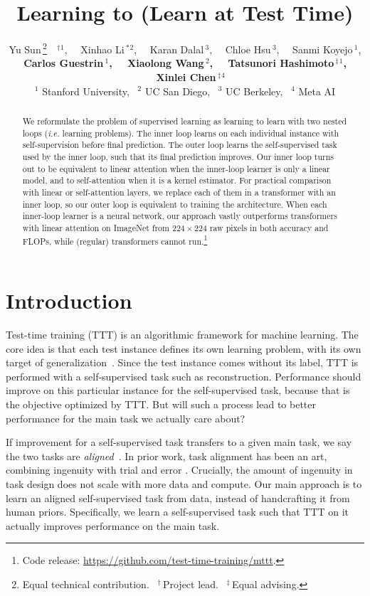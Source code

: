 \documentclass{article} %
\title{Learning to (Learn at Test Time)}
\author{
Yu Sun\,\thanks{Equal technical contribution.
                ~$^\dag$\,Project lead.
                ~$^\ddag$\,Equal advising.}~~$^\dag$$^1$,
~~Xinhao Li\,$^*$$^2$,
~~Karan Dalal\,$^3$,
~~Chloe Hsu\,$^3$,
~~Sanmi Koyejo\,$^1$,\\
\textbf{
Carlos Guestrin\,$^1$,
~~Xiaolong Wang\,$^2$,
~~Tatsunori Hashimoto\,$^\ddag$$^1$,
~~Xinlei Chen\,$^\ddag$$^4$
}\\
$^1$ Stanford University, 
~$^2$ UC San Diego, 
~$^3$ UC Berkeley, 
~$^4$ Meta AI
}
\begin{document}
\maketitle

\begin{abstract}
We reformulate the problem of supervised learning as learning to learn with two nested loops (\textit{i.e.} learning problems).
The inner loop learns on each individual instance with self-supervision before final prediction.
The outer loop learns the self-supervised task used by the inner loop, such that its final prediction improves.
Our inner loop turns out to be equivalent to linear attention when the inner-loop learner is only a linear model, and to self-attention when it is a kernel estimator.
For practical comparison with linear or self-attention layers, we replace each of them in a transformer with an inner loop, so our outer loop is equivalent to training the architecture.
When each inner-loop learner is a neural network, our approach vastly outperforms transformers with linear attention on ImageNet from $224\times 224$ raw pixels in both accuracy and FLOPs, while (regular) transformers cannot run.\footnote{
Code release: \url{https://github.com/test-time-training/mttt}.
}
\end{abstract}

\section{Introduction}
\label{sec:intro}
Test-time training (TTT) is an algorithmic framework for machine learning.
The core idea is that each test instance defines its own learning problem, with its own target of generalization~\citep{sun2020test}.
Since the test instance comes without its label, TTT is performed with a self-supervised task such as reconstruction.
Performance should improve on this particular instance for the self-supervised task, because that is the objective optimized by TTT.
But will such a process lead to better performance for the main task we actually care about?

If improvement for a self-supervised task transfers to a given main task, we say the two tasks are \emph{aligned}~\citep{sun2020test}.
In prior work, task alignment has been an art, combining ingenuity with trial and error \citep{ttt-mae, wang2023test}.
Crucially, the amount of ingenuity in task design does not scale with more data and compute.
Our main approach is to learn an aligned self-supervised task from data, instead of handcrafting it from human priors.
Specifically, we learn a self-supervised task such that TTT on it actually improves performance on the main task.
\end{document}
